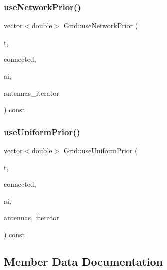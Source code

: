 \subsubsection{\texorpdfstring{useNetworkPrior()}{useNetworkPrior()}}
{\footnotesize\ttfamily vector$<$double$>$ Grid\+::use\+Network\+Prior (\begin{DoxyParamCaption}\item[{unsigned long}]{t,  }\item[{bool}]{connected,  }\item[{vector$<$ \mbox{\hyperlink{class_antenna_info}{Antenna\+Info}} $>$\+::iterator}]{ai,  }\item[{pair$<$ \mbox{\hyperlink{_agents_collection_8h_afde47bc45d604b8b8c72755072376679}{um\+\_\+iterator}}, \mbox{\hyperlink{_agents_collection_8h_afde47bc45d604b8b8c72755072376679}{um\+\_\+iterator}} $>$}]{antennas\+\_\+iterator }\end{DoxyParamCaption}) const\hspace{0.3cm}{\ttfamily [private]}}

\mbox{\label{class_grid_ac77c744828c5cf70dd5650217475e25b}} 
\subsubsection{\texorpdfstring{useUniformPrior()}{useUniformPrior()}}
{\footnotesize\ttfamily vector$<$double$>$ Grid\+::use\+Uniform\+Prior (\begin{DoxyParamCaption}\item[{unsigned long}]{t,  }\item[{bool}]{connected,  }\item[{vector$<$ \mbox{\hyperlink{class_antenna_info}{Antenna\+Info}} $>$\+::iterator}]{ai,  }\item[{pair$<$ \mbox{\hyperlink{_agents_collection_8h_afde47bc45d604b8b8c72755072376679}{um\+\_\+iterator}}, \mbox{\hyperlink{_agents_collection_8h_afde47bc45d604b8b8c72755072376679}{um\+\_\+iterator}} $>$}]{antennas\+\_\+iterator }\end{DoxyParamCaption}) const\hspace{0.3cm}{\ttfamily [private]}}



\subsection{Member Data Documentation}
\mbox{\label{class_grid_a177bfdc70436c25a1510d1abe19e34c1}} 
